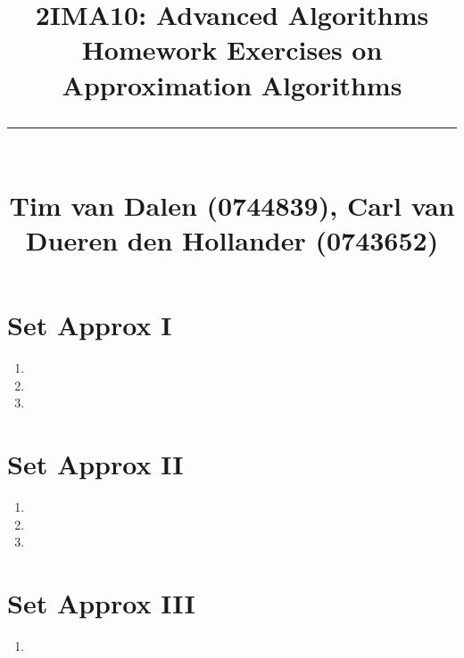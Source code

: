 \documentclass[a4paper,11pt]{article}
\title{
	\huge\raggedright 2IMA10: Advanced Algorithms \hfill\\{\Large Homework Exercises on Approximation Algorithms}\\ \vspace{-0.9\baselineskip}\rule{\linewidth}{1pt}\\
	\small\hfill Tim van Dalen (0744839), Carl van Dueren den Hollander (0743652)
	\normalsize
}
\begin{document}
	\maketitle

	\section*{Set Approx I}
		\begin{enumerate}
			\item 
			\item 
			\item 
		\end{enumerate}
	\section*{Set Approx II}
		\begin{enumerate}
			\item 
			\item 
			\item 
		\end{enumerate}
	\section*{Set Approx III}
		\begin{enumerate}
			\item 
		\end{enumerate}
\end{document}
